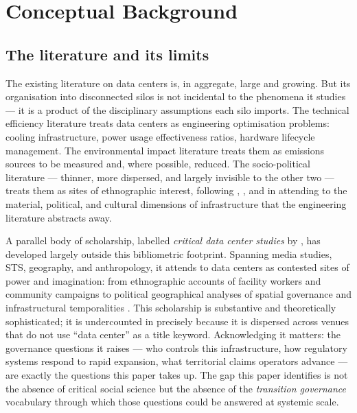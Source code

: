\section{Conceptual Background}
\label{sec:background}

\subsection{The literature and its limits}

The existing literature on data centers is, in aggregate, large and growing. But its organisation into disconnected silos is not incidental to the phenomena it studies — it is a product of the disciplinary assumptions each silo imports. The technical efficiency literature treats data centers as engineering optimisation problems: cooling infrastructure, power usage effectiveness ratios, hardware lifecycle management. The environmental impact literature treats them as emissions sources to be measured and, where possible, reduced. The socio-political literature — thinner, more dispersed, and largely invisible to the other two — treats them as sites of ethnographic interest, following \citet{blum2012tubes}, \citet{holt2015vonderau}, and \citet{vonderau2019storing} in attending to the material, political, and cultural dimensions of infrastructure that the engineering literature abstracts away.

A parallel body of scholarship, labelled \textit{critical data center studies} by \citet{edwards2025making}, has developed largely outside this bibliometric footprint. Spanning media studies, STS, geography, and anthropology, it attends to data centers as contested sites of power and imagination: from ethnographic accounts of facility workers and community campaigns \citep{blum2012tubes,vonderau2019storing} to political geographical analyses of spatial governance \citep{monstadt2025governing,young2026clouds} and infrastructural temporalities \citep{velkova2023plantin}. This scholarship is substantive and theoretically sophisticated; it is undercounted in  precisely because it is dispersed across venues that do not use ``data center'' as a title keyword. Acknowledging it matters: the governance questions it raises — who controls this infrastructure, how regulatory systems respond to rapid expansion, what territorial claims operators advance — are exactly the questions this paper takes up. The gap this paper identifies is not the absence of critical social science but the absence of the \textit{transition governance} vocabulary through which those questions could be answered at systemic scale.

